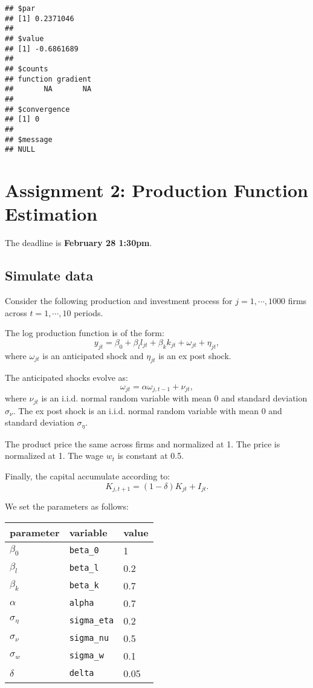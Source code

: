 \documentclass[
]{book}
\begin{document}
\begin{verbatim}
## $par
## [1] 0.2371046
## 
## $value
## [1] -0.6861689
## 
## $counts
## function gradient 
##       NA       NA 
## 
## $convergence
## [1] 0
## 
## $message
## NULL
\end{verbatim}

\hypertarget{assignment2}{%
\chapter{Assignment 2: Production Function Estimation}\label{assignment2}}

The deadline is \textbf{February 28 1:30pm}.

\hypertarget{simulate-data}{%
\section{Simulate data}\label{simulate-data}}

Consider the following production and investment process for \(j = 1, \cdots, 1000\) firms across \(t = 1, \cdots, 10\) periods.

The log production function is of the form:
\[
y_{jt} = \beta_0 + \beta_l l_{jt} + \beta_k k_{jt} + \omega_{jt} + \eta_{jt},
\]
where \(\omega_{jt}\) is an anticipated shock and \(\eta_{jt}\) is an ex post shock.

The anticipated shocks evolve as:
\[
\omega_{jt} = \alpha \omega_{j, t - 1} + \nu_{jt},
\]
where \(\nu_{jt}\) is an i.i.d. normal random variable with mean 0 and standard deviation \(\sigma_\nu\). The ex post shock is an i.i.d. normal random variable with mean 0 and standard deviation \(\sigma_{\eta}\).

The product price the same across firms and normalized at 1. The price is normalized at 1. The wage \(w_t\) is constant at 0.5.

Finally, the capital accumulate according to:
\[
K_{j, t + 1} = (1 - \delta) K_{jt} + I_{jt}.
\]

We set the parameters as follows:

\begin{longtable}[]{@{}lll@{}}
\toprule
parameter & variable & value\tabularnewline
\midrule
\endhead
\(\beta_0\) & \texttt{beta\_0} & 1\tabularnewline
\(\beta_l\) & \texttt{beta\_l} & 0.2\tabularnewline
\(\beta_k\) & \texttt{beta\_k} & 0.7\tabularnewline
\(\alpha\) & \texttt{alpha} & 0.7\tabularnewline
\(\sigma_{\eta}\) & \texttt{sigma\_eta} & 0.2\tabularnewline
\(\sigma_{\nu}\) & \texttt{sigma\_nu} & 0.5\tabularnewline
\(\sigma_{w}\) & \texttt{sigma\_w} & 0.1\tabularnewline
\(\delta\) & \texttt{delta} & 0.05\tabularnewline
\bottomrule
\end{longtable}
\end{document}
